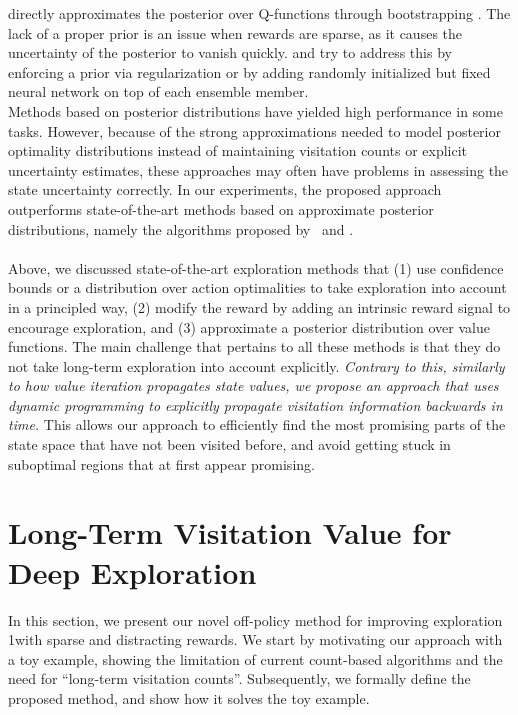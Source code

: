 \documentclass{article}
\begin{document}
directly approximates the posterior over Q-functions through
bootstrapping \citep{efron1982jackknife}. The lack of a proper prior
is an issue when rewards are sparse, as it causes the uncertainty of
the posterior to vanish quickly. \citet{osband2019deep} and
\citet{osband2018randomized} try to address this by enforcing a prior
via regularization or by adding randomly initialized but fixed neural
network on top of each ensemble member. 
\\
Methods based on posterior distributions have yielded high performance in some tasks. However,
because of the strong approximations needed to model posterior optimality
distributions instead of maintaining visitation counts or explicit
uncertainty estimates, these approaches may often have problems in
assessing the state uncertainty correctly.
In our experiments, the proposed approach outperforms state-of-the-art methods based on approximate posterior distributions, namely the algorithms proposed by~\citet{osband2016deep,osband2019deep} and \citet{deramo2019exploiting}.

\paragraph{}
Above, we discussed state-of-the-art exploration methods that (1) use
confidence bounds or a distribution over action optimalities to take
exploration into account in a principled way, (2) modify the reward by adding an intrinsic reward signal to encourage exploration, and (3) approximate a posterior distribution over
value functions. The main challenge that pertains to all these methods
is that they do not take long-term
exploration into account explicitly. 
\textit{Contrary to this,
similarly to how value iteration propagates state values, we propose an approach that uses dynamic programming to explicitly propagate visitation information backwards in time.} 
This allows our approach to efficiently
find the most promising parts of the state space that have not been
visited before, and avoid getting stuck in suboptimal 
regions that at first appear promising.



\clearpage



\section{Long-Term Visitation Value for Deep Exploration}
\label{sec:vv}
In this section, we present our novel off-policy method for improving exploration 1with sparse and distracting rewards.
We start by motivating our approach with a toy example, showing the limitation of current count-based algorithms and the need for ``long-term visitation counts''. Subsequently, we formally define the proposed method, and show how it solves the toy example.
\end{document}
